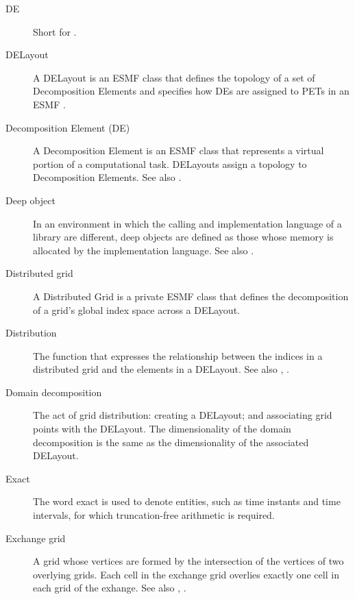 \begin{description}
\item[DE] \label{glos:DE} 
  Short for .

\item[DELayout] \label{glos:DELayout} A DELayout is an ESMF class that
  defines the topology of a set of Decomposition Elements and specifies 
  how DEs are assigned to PETs in an ESMF  
  . 

\item[Decomposition Element (DE)] \label{glos:Decomp_Element}
  A Decomposition Element is an ESMF class that represents a 
  virtual portion of a computational task.
  DELayouts assign a topology to Decomposition Elements.
  See also .

\item[Deep object] \label{glos:DeepObjects} In an environment
  in which the calling and implementation language of a library are
  different, deep objects are defined as those whose memory is 
  allocated by the implementation language. 
  See also . 

\item[Distributed grid] \label{glos:DistGrid}
  A Distributed Grid is a private ESMF class that defines the 
  decomposition of a grid's global index space across a DELayout. 

\item[Distribution] \label{glos:Distribution} The function that expresses
  the relationship between the indices in a distributed grid and the elements 
  in a DELayout. See also , 
  . 

\item[Domain decomposition] \label{glos:DomainDecomp} The act of grid 
  distribution: creating a DELayout; and associating grid points with 
  the DELayout.  The dimensionality of the domain decomposition is the 
  same as the dimensionality of the associated DELayout.

\item [Exact] \label{glos:Exact} The word exact is used
  to denote entities, such as time instants and time intervals, for 
  which truncation-free arithmetic is required. 

\item[Exchange grid] \label{glos:ExchangeGrid} A grid whose vertices are
  formed by the intersection of the vertices of two overlying grids.  Each 
  cell in the exchange grid overlies exactly one cell in each grid of the 
  exhange. See also , .


\end{description}
